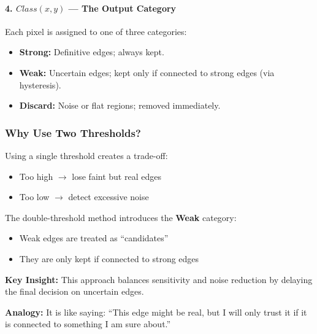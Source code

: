 \documentclass[12pt]{article}
\begin{document}
\paragraph{4. $Class(x,y)$ — The Output Category}

Each pixel is assigned to one of three categories:

\begin{itemize}
    \item \textbf{Strong:} Definitive edges; always kept.
    \item \textbf{Weak:} Uncertain edges; kept only if connected to strong edges (via hysteresis).
    \item \textbf{Discard:} Noise or flat regions; removed immediately.
\end{itemize}

\subsubsection*{Why Use Two Thresholds?}

Using a single threshold creates a trade-off:
\begin{itemize}
    \item Too high $\rightarrow$ lose faint but real edges
    \item Too low $\rightarrow$ detect excessive noise
\end{itemize}

The double-threshold method introduces the \textbf{Weak} category:

\begin{itemize}
    \item Weak edges are treated as ``candidates''
    \item They are only kept if connected to strong edges
\end{itemize}

\textbf{Key Insight:}
This approach balances sensitivity and noise reduction by delaying the final decision on uncertain edges.

\textbf{Analogy:}
It is like saying: ``This edge might be real, but I will only trust it if it is connected to something I am sure about.''
\end{document}
